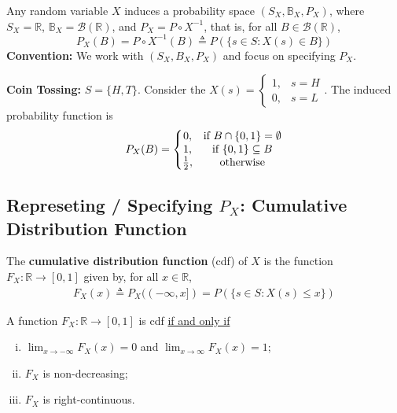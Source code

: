 \documentclass[11pt]{elegantbook}
\begin{document}
\begin{definition}
    \normalfont
    Any random variable $X$ induces a probability space $(S_X,\mathbb{B}_X,P_X)$, where $S_X=\mathbb{R}$, $\mathbb{B}_X=\mathcal{B}(\mathbb{R})$, and $P_X=P\circ X^{-1}$, that is, for all $B\in \mathcal{B}(\mathbb{R})$, $$P_X(B)=P\circ X^{-1}(B)\triangleq P(\{s\in S: X(s)\in B\})$$
    \textbf{Convention:} We work with $(S_X,B_X,P_X)$ and focus on specifying $P_X$.
\end{definition}

\begin{example}
    \textbf{Coin Tossing:} $S=\{H,T\}$. Consider the $X(s)=\left\{\begin{matrix}
        1,&s=H\\
        0,&s=L
    \end{matrix}\right.$. The induced probability function is $$P_X(B)=\left\{\begin{matrix}
        0,&\textnormal{if }B\cap\{0,1\}=\emptyset\\
        1,&\textnormal{if }\{0,1\}\subseteq B\\
        \frac{1}{2},&\textnormal{otherwise}
    \end{matrix}\right.$$
\end{example}

\subsection{Represeting / Specifying $P_X$: Cumulative Distribution Function}
\begin{definition}
    \normalfont
    The \textbf{cumulative distribution function} (cdf) of $X$ is the function $F_X: \mathbb{R} \rightarrow [0,1]$ given by, for all $x\in \mathbb{R}$,
    \begin{equation}
        \begin{aligned}
            F_X(x)\triangleq P_X((-\infty,x])=P(\{s\in S: X(s)\leq x\})
        \end{aligned}
        \nonumber
    \end{equation}
\end{definition}

\begin{theorem}
    A function $F_X: \mathbb{R} \rightarrow [0,1]$ is cdf \underline{if and only if}
    \begin{enumerate}[(i).]
        \item $\lim_{x \rightarrow -\infty} F_X(x)=0$ and $\lim_{x \rightarrow \infty} F_X(x)=1$;
        \item $F_X$ is non-decreasing;
        \item $F_X$ is right-continuous.
    \end{enumerate}
\end{theorem}
\end{document}
